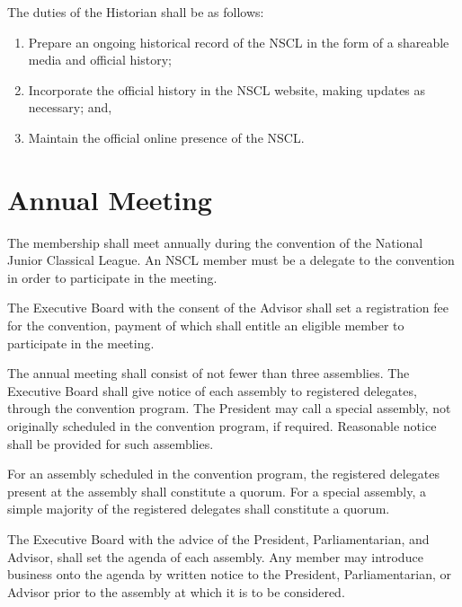 \documentclass{bylaws_nofont}
\newcommand{\NSCL}{\textsc{NSCL}\xspace}
\begin{document}
\begin{linenumbers}[1]
\begin{enumerate}
    \sub[Historian] The duties of the Historian shall be as follows:
    \begin{enumerate}
    \item Prepare an ongoing historical record of the \NSCL in the form
      of a shareable media and official history;
    \item Incorporate the official history in the \NSCL website, making
      updates as necessary; and,
    \item Maintain the official online presence of the \NSCL.\\
    \end{enumerate}
  \end{enumerate}


  \section{Annual Meeting} 
  The membership shall meet annually during the convention of the
  National Junior Classical League. An \NSCL member must be a delegate
  to the convention in order to participate in the meeting.
  \begin{enumerate}
     The Executive Board with the consent of the
    Advisor shall set a registration fee for the convention, payment of
    which shall entitle an eligible member to participate in the
    meeting.
    
    \sub[Assemblies] The annual meeting shall consist of not fewer than
    three assemblies. The Executive Board shall give notice of each
    assembly to registered delegates, through the convention program. The
    President may call a special assembly, not originally scheduled in
    the convention program, if required. Reasonable notice shall be
    provided for such assemblies.
    
    \sub[Quorum] For an assembly scheduled in the convention program,
    the registered delegates present at the assembly shall constitute a
    quorum. For a special assembly, a simple majority of the registered
    delegates shall constitute a quorum.
    
    \sub[Agenda] The Executive Board with the advice of the President,
    Parliamentarian, and Advisor, shall set the agenda of each
    assembly. Any member may introduce business onto the agenda by
    written notice to the President,  Parliamentarian, or Advisor prior
    to the assembly at which it is to be considered.\\ 
  \end{enumerate}


\end{linenumbers}
\end{document}
